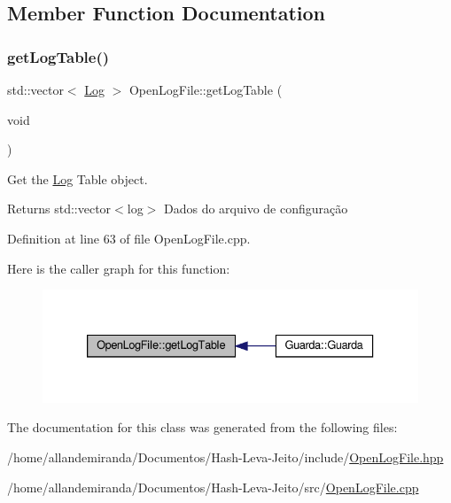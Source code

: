 \subsection{Member Function Documentation}
\mbox{\label{class_open_log_file_ac18d5b3bc39aad3a0c2ebd761294716b}} 
\subsubsection{\texorpdfstring{get\+Log\+Table()}{getLogTable()}}
{\footnotesize\ttfamily std\+::vector$<$ \hyperlink{class_log}{Log} $>$ Open\+Log\+File\+::get\+Log\+Table (\begin{DoxyParamCaption}\item[{void}]{ }\end{DoxyParamCaption})}



Get the \hyperlink{class_log}{Log} Table object. 

\begin{DoxyReturn}{Returns}
std\+::vector$<$log$>$ Dados do arquivo de configuração 
\end{DoxyReturn}


Definition at line 63 of file Open\+Log\+File.\+cpp.

Here is the caller graph for this function\+:
\nopagebreak
\begin{figure}[H]
\begin{center}
\leavevmode
\includegraphics[width=333pt]{db/d15/class_open_log_file_ac18d5b3bc39aad3a0c2ebd761294716b_icgraph}
\end{center}
\end{figure}


The documentation for this class was generated from the following files\+:\begin{DoxyCompactItemize}
\item 
/home/allandemiranda/\+Documentos/\+Hash-\/\+Leva-\/\+Jeito/include/\hyperlink{_open_log_file_8hpp}{Open\+Log\+File.\+hpp}\item 
/home/allandemiranda/\+Documentos/\+Hash-\/\+Leva-\/\+Jeito/src/\hyperlink{_open_log_file_8cpp}{Open\+Log\+File.\+cpp}\end{DoxyCompactItemize}
